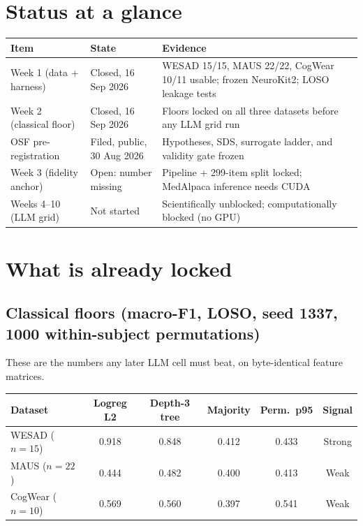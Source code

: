 \documentclass[11pt]{article}
\begin{document}
\section{Status at a glance}

{\small
\begin{tabularx}{\textwidth}{@{}L{3.55cm}L{3.7cm}Y@{}}
\textbf{Item} & \textbf{State} & \textbf{Evidence} \\
\midrule
Week 1 (data + harness) & Closed, 16 Sep 2026 & WESAD 15/15, MAUS 22/22, CogWear 10/11 usable; frozen NeuroKit2; LOSO leakage tests \\
Week 2 (classical floor) & Closed, 16 Sep 2026 & Floors locked on all three datasets before any LLM grid run \\
OSF pre-registration & Filed, public, 30 Aug 2026 & Hypotheses, SDS, surrogate ladder, and validity gate frozen \\
Week 3 (fidelity anchor) & Open: number missing & Pipeline + 299-item split locked; MedAlpaca inference needs CUDA \\
Weeks 4--10 (LLM grid) & Not started & Scientifically unblocked; computationally blocked (no GPU) \\
\end{tabularx}
}

\section{What is already locked}

\subsection{Classical floors (macro-F1, LOSO, seed 1337, 1000 within-subject permutations)}

These are the numbers any later LLM cell must beat, on byte-identical feature matrices.

{\small
\begin{tabular}{@{}lccccc@{}}
\toprule
\rowcolor{TableHead}
\textbf{Dataset} & \textbf{Logreg L2} & \textbf{Depth-3 tree} & \textbf{Majority} & \textbf{Perm.\ p95} & \textbf{Signal} \\
\midrule
WESAD ($n{=}15$) & 0.918 & 0.848 & 0.412 & 0.433 & Strong \\
MAUS ($n{=}22$) & 0.444 & 0.482 & 0.400 & 0.413 & Weak \\
CogWear ($n{=}10$) & 0.569 & 0.560 & 0.397 & 0.541 & Weak \\
\bottomrule
\end{tabular}
}
\end{document}
